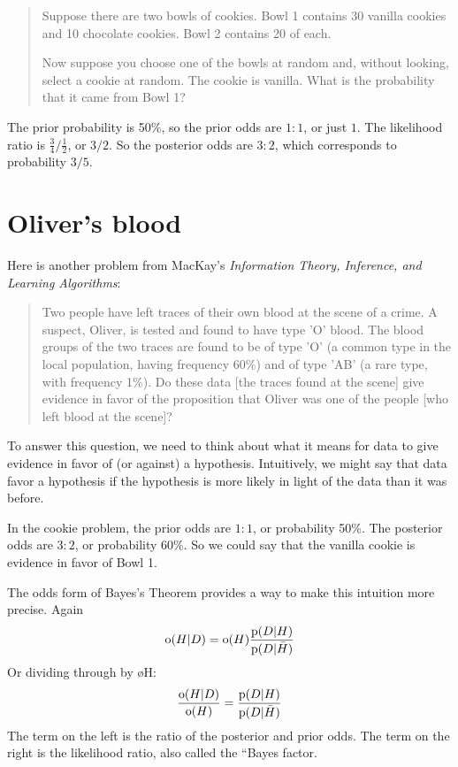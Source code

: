 \documentclass[12pt]{book}
\begin{document}
\begin{quote}
Suppose there are two bowls of cookies.  Bowl 1 contains
  30 vanilla cookies and 10 chocolate cookies.  Bowl 2 contains 20 of
  each.

Now suppose you choose one of the bowls at random and, without looking,
select a cookie at random.  The cookie is vanilla.  What is the probability
that it came from Bowl 1?
\end{quote}

The prior probability is 50\%, so the prior odds are $1:1$, or just
$1$.  The likelihood ratio is $\frac{3}{4} / \frac{1}{2}$, or $3/2$.
So the posterior odds are $3:2$, which corresponds to probability
$3/5$.


\section{Oliver's blood}
\label{evidence}

Here is another problem from MacKay's {\it Information Theory,
  Inference, and Learning Algorithms}:

\begin{quote}
Two people have left traces of their own blood at the scene of
a crime.  A suspect, Oliver, is tested and found to have type
'O' blood.  The blood groups of the two traces are found to
be of type 'O' (a common type in the local population, having frequency
60\%) and of type 'AB' (a rare type, with frequency 1\%).
Do these data [the traces found at the scene] give evidence
in favor of the proposition that Oliver was one of the people
[who left blood at the scene]?
\end{quote}

To answer this question, we need to think about what it means
for data to give evidence in favor of (or against) a hypothesis.
Intuitively, we might say that data favor a hypothesis if the
hypothesis is more likely in light of the data than it was before.

In the cookie problem, the prior odds are $1:1$, or probability 50\%.
The posterior odds are $3:2$, or probability 60\%.  So we could say
that the vanilla cookie is evidence in favor of Bowl 1.

The odds form of Bayes's Theorem provides a way to make this
intuition more precise.  Again
%
\[ \mathrm{o}(H|D) = \mathrm{o}(H) \frac{\mathrm{p}(D|H)}{\mathrm{p}(D|\bar{H})} \]
%
Or dividing through by \o{H}:
%
\[ \frac{\mathrm{o}(H|D)}{\mathrm{o}(H)} = \frac{\mathrm{p}(D|H)}{\mathrm{p}(D|\bar{H})} \]
%
The term on the left is the ratio of the posterior and prior odds.
The term on the right is the likelihood ratio, also called the ``Bayes
factor.
\end{document}
